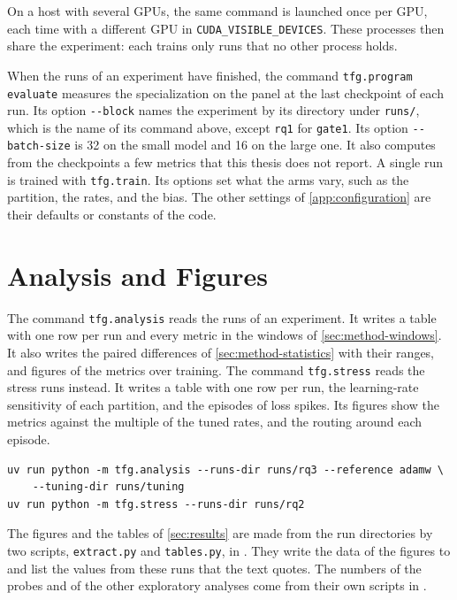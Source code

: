 On a host with several GPUs, the same command is launched once per GPU, each time with a different GPU in \texttt{CUDA\_VISIBLE\_DEVICES}\@. These processes then share the experiment: each trains only runs that no other process holds.

When the runs of an experiment have finished, the command \texttt{tfg.program evaluate} measures the specialization on the panel at the last checkpoint of each run. Its option \texttt{-{}-block} names the experiment by its directory under \texttt{runs/}, which is the name of its command above, except \texttt{rq1} for \texttt{gate1}. Its option \texttt{-{}-batch-size} is 32 on the small model and 16 on the large one. It also computes from the checkpoints a few metrics that this thesis does not report. A single run is trained with \texttt{tfg.train}. Its options set what the arms vary, such as the partition, the rates, and the bias. The other settings of \cref{app:configuration} are their defaults or constants of the code.

\section{Analysis and Figures}
\label{app:reproduction-analysis}
The command \texttt{tfg.analysis} reads the runs of an experiment. It writes a table with one row per run and every metric in the windows of \cref{sec:method-windows}. It also writes the paired differences of \cref{sec:method-statistics} with their ranges, and figures of the metrics over training. The command \texttt{tfg.stress} reads the stress runs instead. It writes a table with one row per run, the learning-rate sensitivity of each partition, and the episodes of loss spikes. Its figures show the metrics against the multiple of the tuned rates, and the routing around each episode.
\begin{verbatim}
uv run python -m tfg.analysis --runs-dir runs/rq3 --reference adamw \
    --tuning-dir runs/tuning
uv run python -m tfg.stress --runs-dir runs/rq2
\end{verbatim}
The figures and the tables of \cref{sec:results} are made from the run directories by two scripts, \texttt{extract.py} and \texttt{tables.py}, in . They write the data of the figures to  and list the values from these runs that the text quotes. The numbers of the probes and of the other exploratory analyses come from their own scripts in .

